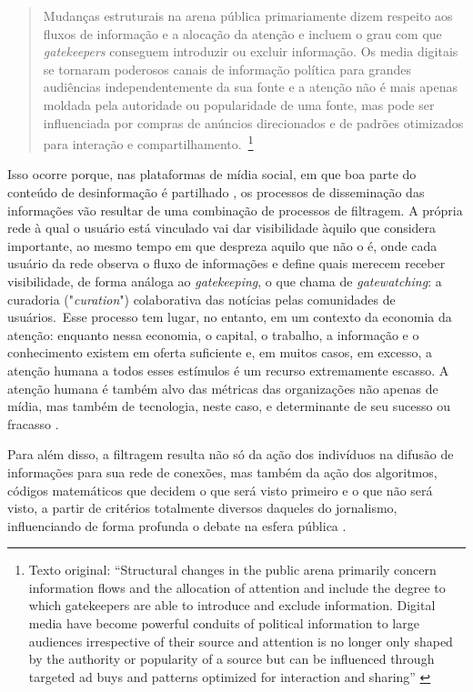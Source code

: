 \documentclass[portuguese]{textolivre}
\begin{document}
\begin{quote}
    Mudanças estruturais na arena pública primariamente dizem respeito aos fluxos de informação e a alocação da atenção e incluem o grau com que \emph{gatekeepers} conseguem introduzir ou excluir informação. Os media digitais se tornaram poderosos canais de informação política para grandes audiências independentemente da sua fonte e a atenção não é mais apenas moldada pela autoridade ou popularidade de uma fonte, mas pode ser influenciada por compras de anúncios direcionados e de padrões otimizados para interação e compartilhamento. \cite[p. 2, tradução nossa]{jungherr_disinformation_2021}\footnote{Texto original: “Structural changes in the public arena primarily concern information flows and the allocation of attention and include the degree to which gatekeepers are able to introduce and exclude information. Digital media have become powerful conduits of political information to large audiences irrespective of their source and attention is no longer only shaped by the authority or popularity of a source but can be influenced through targeted ad buys and patterns optimized for interaction and sharing” \cite[p. 2]{jungherr_disinformation_2021}}
\end{quote}

Isso ocorre porque, nas plataformas de mídia social, em que boa parte do conteúdo de desinformação é partilhado \cite{baptista_understanding_2020}, os processos de disseminação das informações vão resultar de uma combinação de processos de filtragem. A própria rede à qual o usuário está vinculado vai dar visibilidade àquilo que considera importante, ao mesmo tempo em que despreza aquilo que não o é, onde cada usuário da rede observa o fluxo de informações e define quais merecem receber visibilidade, de forma análoga ao \emph{gatekeeping}, o que \textcite{bruns_gatekeeping_2011} chama de \emph{gatewatching}: a curadoria ("\emph{curation}") colaborativa das notícias pelas comunidades de usuários. Esse processo tem lugar, no entanto, em um contexto da economia da atenção: enquanto nessa economia, o capital, o trabalho, a informação e o conhecimento existem em oferta suficiente e, em muitos casos, em excesso, a atenção humana a todos esses estímulos é um recurso extremamente escasso. A atenção humana é também alvo das métricas das organizações não apenas de mídia, mas também de tecnologia, neste caso, e determinante de seu sucesso ou fracasso \cite{davenport_attention_2001}.

Para além disso, a filtragem resulta não só da ação dos indivíduos na difusão de informações para sua rede de conexões, mas também da ação dos algoritmos, códigos matemáticos que decidem o que será visto primeiro e o que não será visto, a partir de critérios totalmente diversos daqueles do jornalismo, influenciando de forma profunda o debate na esfera pública \cite{recuero2017midia}.
\end{document}
